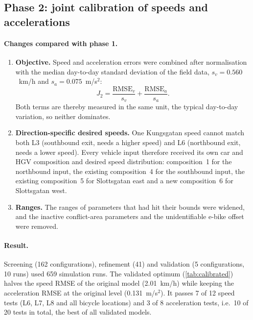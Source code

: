 \documentclass[11pt,a4paper]{article}
\newcommand{\RMSE}{\mathrm{RMSE}}
\newcommand{\kmh}{~km/h}
\newcommand{\mss}{~m/s$^2$}
\begin{document}
\subsection{Phase 2: joint calibration of speeds and accelerations}
\label{sec:phase2}

\paragraph{Changes compared with phase 1.}
\begin{enumerate}
  \item \textbf{Objective.} Speed and acceleration errors were combined after normalisation with the
        median day-to-day standard deviation of the field data, $s_v = 0.560$\kmh{} and
        $s_a = 0.075$\mss:
        \begin{equation}
        J_2 = \frac{\RMSE_v}{s_v} + \frac{\RMSE_a}{s_a}.
        \end{equation}
        Both terms are thereby measured in the same unit, the typical day-to-day variation, so
        neither dominates.
  \item \textbf{Direction-specific desired speeds.} One Kungsgatan speed cannot match both L3
        (southbound exit, needs a higher speed) and L6 (northbound exit, needs a lower speed). Every
        vehicle input therefore received its own car and HGV composition and desired speed
        distribution: composition~1 for the northbound input, the existing composition~4 for the
        southbound input, the existing composition~5 for Slottsgatan east and a new composition~6
        for Slottsgatan west.
  \item \textbf{Ranges.} The ranges of parameters that had hit their bounds were widened, and the
        inactive conflict-area parameters and the unidentifiable e-bike offset were removed.
\end{enumerate}

\paragraph{Result.} Screening (162 configurations), refinement (41) and validation (5
configurations, 10 runs) used 659 simulation runs. The validated optimum (\cref{tab:calibrated})
halves the speed RMSE of the original model (2.01\kmh) while keeping the acceleration RMSE at the
original level (0.131\mss). It passes 7 of 12 speed tests (L6, L7, L8 and all bicycle locations)
and 3 of 8 acceleration tests, i.e.\ 10 of 20 tests in total, the best of all validated models.
\end{document}
